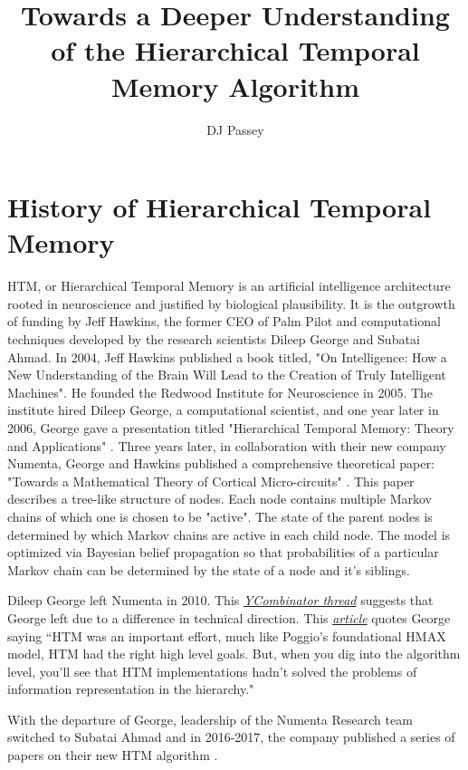 \documentclass{article}
\begin{document}
 
\title{Towards a Deeper Understanding of the Hierarchical Temporal Memory Algorithm}
\author{DJ Passey}
\maketitle

\section*{History of Hierarchical Temporal Memory}
HTM, or Hierarchical Temporal Memory is an artificial intelligence architecture rooted in neuroscience and justified by biological plausibility. It is the outgrowth of funding by Jeff Hawkins, the former CEO of Palm Pilot and computational techniques developed by the research scientists Dileep George and Subatai Ahmad. In 2004, Jeff Hawkins published a book titled, "On Intelligence: How a New Understanding of the Brain Will Lead to the Creation of Truly Intelligent Machines". He founded the Redwood Institute for Neuroscience in 2005. The institute hired Dileep George, a computational scientist, and one year later in 2006, George gave a presentation titled "Hierarchical Temporal Memory: Theory and Applications" \cite{George2006}. Three years later, in collaboration with their new company Numenta, George and Hawkins published a comprehensive theoretical paper: "Towards a Mathematical Theory of Cortical Micro-circuits" \cite{George2009}. This paper describes a tree-like structure of nodes. Each node contains multiple Markov chains of which one is chosen to be "active". The state of the parent nodes is determined by which 
Markov chains are active in each child node. The model is optimized via  Bayesian belief propagation so that probabilities of a particular Markov chain can be determined by the state of a node and it's siblings. 

Dileep George left Numenta in 2010. This \textit{\href{https://news.ycombinator.com/item?id=7443016}{YCombinator thread}} suggests that George left due to a difference in technical direction. This \href{https://www.kurzweilai.net/vicarious-announces-15-million-funding-for-ai-software-based-on-the-brain}{\textit{article}} quotes George saying ``HTM was an important effort, much like Poggio’s foundational HMAX model, HTM had the right high level goals. But, when you dig into the algorithm level, you’ll see that HTM implementations hadn’t solved the problems of information representation in the hierarchy."

With the departure of George, leadership of the Numenta Research team switched to Subatai Ahmad and in 2016-2017, the company published a series of papers on their new HTM algorithm \cite{Cui2016b, Cui2016, Cui2017, Hawkins2016}.
\end{document}
